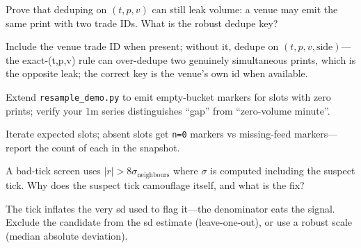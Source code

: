 \begin{exercise}[hard]
Prove that deduping on $(t,p,v)$ can still leak volume: a venue may emit the same print with
two trade IDs. What is the robust dedupe key?
\end{exercise}
\begin{solution}
Include the venue trade ID when present; without it, dedupe on $(t,p,v,\text{side})$---the
exact-(t,p,v) rule can over-dedupe two genuinely simultaneous prints, which is the opposite
leak; the correct key is the venue's own id when available.
\end{solution}

\begin{exercise}[hard]
Extend \texttt{resample\_demo.py} to emit empty-bucket markers for slots with zero prints;
verify your 1m series distinguishes ``gap'' from ``zero-volume minute''.
\end{exercise}
\begin{solution}
Iterate expected slots; absent slots get \texttt{n=0} markers vs missing-feed markers---
report the count of each in the snapshot.
\end{solution}

\begin{exercise}[hard]
A bad-tick screen uses $|r|>8\sigma_{\text{neighbours}}$ where $\sigma$ is computed including
the suspect tick. Why does the suspect tick camouflage itself, and what is the fix?
\end{exercise}
\begin{solution}
The tick inflates the very sd used to flag it---the denominator eats the signal. Exclude the
candidate from the sd estimate (leave-one-out), or use a robust scale (median absolute
deviation).
\end{solution}

